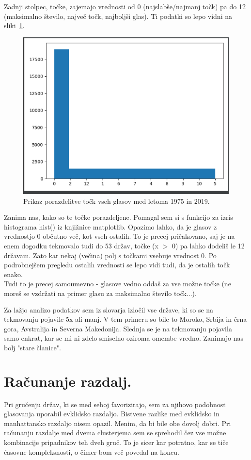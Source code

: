\documentclass[a4paper,11pt]{article}
\begin{document}
Zadnji stolpec, točke, zajemajo vrednosti od 0 (najslabše/najmanj točk) pa do 12 (maksimalno število, največ točk, najboljši glas).
Ti podatki so lepo vidni na sliki~\ref{slika1}.
\begin{figure}[h!]
\begin{center}
\includegraphics[scale=0.45]{zero-values-votes.png}
\caption{Prikaz porazdelitve točk vseh glasov med letoma 1975 in 2019.}
\label{slika1}
\end{center}
\end{figure}

Zanima nas, kako so te točke porazdeljene. Pomagal sem si s funkcijo za izris histograma hist() iz knjižnice matplotlib.
Opazimo lahko, da je glasov z vrednostjo 0 občutno več, kot vseh ostalih. To je precej pričakovano, saj je na enem dogodku
tekmovalo tudi do 53 držav, točke (x $>$ 0) pa lahko dodeliš le 12 državam. Zato kar nekaj (večina) polj s točkami vsebuje vrednost 0.
Po podrobnejšem pregledu ostalih vrednosti se lepo vidi tudi, da je ostalih točk enako.
\\Tudi to je precej samoumevno -
glasove vedno oddaš za vse možne točke (ne moreš se vzdržati na primer glasu za maksimalno število točk...).

Za lažjo analizo podatkov sem iz slovarja izločil vse države, ki so se na tekmovanju pojavile 5x ali manj. V tem primeru so bile
to Moroko, Srbija in črna gora, Avstralija in Severna Makedonija. Slednja se je na tekmovanju pojavila samo enkrat, kar se
mi ni zdelo smiselno oziroma omembe vredno. Zanimajo nas bolj "stare članice".

\section{Računanje razdalj.}
Pri gručenju držav, ki se med seboj favorizirajo, sem za njihovo podobnost glasovanja uporabil evklidsko razdaljo.
Bistvene razlike med evklidsko in manhattansko razdaljo nisem opazil. Menim, da bi bile obe dovolj dobri.
Pri računanju razdalje med dvema clusterjema sem se sprehodil čez vse možne kombinacije pripadnikov teh dveh gruč.
To je sicer kar potratno, kar se tiče časovne kompleksnosti, o čimer bom več povedal na koncu.
\end{document}
